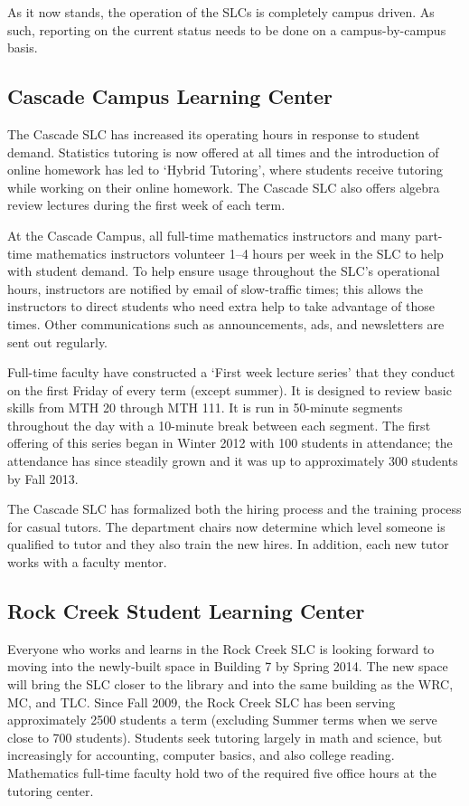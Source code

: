 As it now stands, the operation of the SLCs is completely campus driven.  As such, reporting on the current status needs to be done on a campus-by-campus basis.

\subsection{Cascade Campus Learning Center}
The Cascade SLC has increased its operating hours in response to student demand. Statistics tutoring is now offered at all times and the introduction of online homework has led to `Hybrid Tutoring', where students receive tutoring while working on their online homework. The Cascade SLC also offers algebra review lectures during the first week of each term.

At the Cascade Campus, all full-time mathematics instructors and many part-time mathematics instructors volunteer 1--4 hours per week in the SLC to help with student demand. To help ensure usage throughout the SLC's operational hours, instructors are notified by email of slow-traffic times; this allows the instructors to direct students who need extra help to take advantage of those times. Other communications such as announcements, ads, and newsletters are sent out regularly.

Full-time faculty have constructed a `First week lecture series' that they conduct on the first Friday of every term (except summer). It is designed to review basic skills from MTH 20 through MTH 111. It is run in 50-minute segments throughout the day with a 10-minute break between each segment. The first offering of this series began in Winter 2012 with 100 students in attendance; the attendance has since steadily grown and it was up to approximately 300 students by Fall 2013. 

The Cascade SLC has formalized both the hiring process and the training process for casual tutors. The department chairs now determine which level someone is qualified to tutor and they also train the new hires. In addition, each new tutor works with a faculty mentor.

\subsection{Rock Creek Student Learning Center}
Everyone who works and learns in the Rock Creek SLC is looking forward to moving into the newly-built space in Building 7 by Spring 2014. The new space will bring the SLC closer to the library and into the same building as the WRC, MC, and TLC.  Since Fall 2009, the Rock Creek SLC has been serving approximately 2500 students a term (excluding Summer terms when we serve close to 700 students).  Students seek tutoring largely in math and science, but increasingly for accounting, computer basics, and also college reading.  Mathematics full-time faculty hold two of the required five office hours at the tutoring center.

